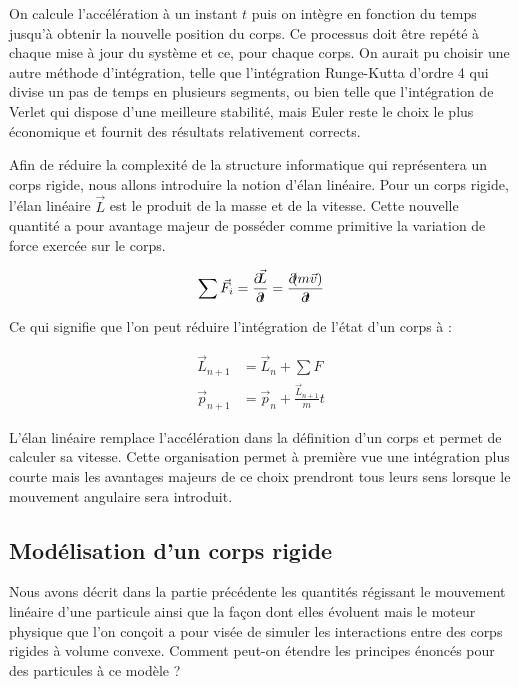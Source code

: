 On calcule l'accélération à un instant $t$ puis on intègre en fonction du temps jusqu'à obtenir la nouvelle position du corps. Ce processus doit être repété à chaque mise à jour du système et ce, pour chaque corps. On aurait pu choisir une autre méthode d'intégration, telle que l'intégration Runge-Kutta d'ordre 4 qui divise un pas de temps en plusieurs segments, ou bien telle que l'intégration de Verlet qui dispose d'une meilleure stabilité, mais Euler reste le choix le plus économique et fournit des résultats relativement corrects.

Afin de réduire la complexité de la structure informatique qui représentera un corps rigide, nous allons introduire la notion d'élan linéaire. Pour un corps rigide, l'élan linéaire $\vec{L}$ est le produit de la masse et de la vitesse. Cette nouvelle quantité a pour avantage majeur de posséder comme primitive la variation de force exercée sur le corps.

\begin{align*}
  {\sum \vec{F}_i} = \frac{\deriv \vec{L}}{\deriv t} = \frac{\deriv (m\vec{v})}{\deriv t}
\end{align*}

Ce qui signifie que l'on peut réduire l'intégration de l'état d'un corps à :

\begin{align*}
  \vec{L}_{n+1} &= \vec{L}_n + {\sum F} \\
  \vec{p}_{n+1} &= \vec{p}_n + \frac{\vec{L}_{n+1}}{m} t
\end{align*}

L'élan linéaire remplace l'accélération dans la définition d'un corps et permet de calculer sa vitesse. Cette organisation permet à première vue une intégration plus courte mais les avantages majeurs de ce choix prendront tous leurs sens lorsque le mouvement angulaire sera introduit.

\subsection{Modélisation d'un corps rigide}

Nous avons décrit dans la partie précédente les quantités régissant le mouvement linéaire d'une particule ainsi que la façon dont elles évoluent mais le moteur physique que l'on conçoit a pour visée de simuler les interactions entre des corps rigides à volume convexe. Comment peut-on étendre les principes énoncés pour des particules à ce modèle ?

